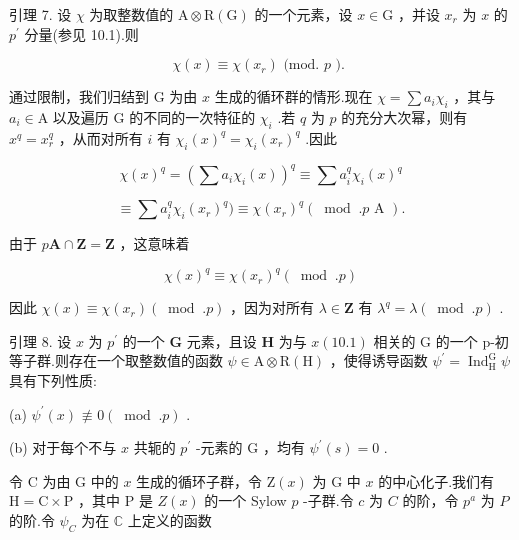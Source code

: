 \documentclass[10pt]{article}
\begin{document}
引理 7. 设 \(\chi\) 为取整数值的 \(\mathrm{A} \otimes  \mathrm{R}\left( \mathrm{G}\right)\) 的一个元素，设 \(x \in  \mathrm{G}\) ，并设 \({x}_{r}\) 为 \(x\) 的 \({p}^{\prime }\) 分量(参见 10.1).则

\[
\chi \left( x\right)  \equiv  \chi \left( {x}_{r}\right) \text{ (mod. }p\text{ ). }
\]

通过限制，我们归结到 G 为由 \(x\) 生成的循环群的情形.现在 \(\chi  = \sum {a}_{i}{\chi }_{i}\) ，其与 \({a}_{i} \in  \mathrm{A}\) 以及遍历 G 的不同的一次特征的 \({\chi }_{i}\) .若 \(q\) 为 \(p\) 的充分大次幂，则有 \({x}^{q} = {x}_{r}^{q}\) ，从而对所有 \(i\) 有 \({\chi }_{i}{\left( x\right) }^{q} = {\chi }_{i}{\left( {x}_{r}\right) }^{q}\) .因此

\[
\chi {\left( x\right) }^{q} = {\left( \sum {a}_{i}{\chi }_{i}\left( x\right) \right) }^{q} \equiv  \sum {a}_{i}^{q}{\chi }_{i}{\left( x\right) }^{q}
\]

\[
\equiv  \sum {a}_{i}^{q}{\chi }_{i}{\left( {x}_{r}\right) }^{q}) \equiv  \chi {\left( {x}_{r}\right) }^{q}\left( {{\;\operatorname{mod}\;.}p\text{ A }}\right) .
\]

由于 \(p\mathbf{A} \cap  \mathbf{Z} = \mathbf{Z}\) ，这意味着

\[
\chi {\left( x\right) }^{q} \equiv  \chi {\left( {x}_{r}\right) }^{q}\left( {\;\operatorname{mod}\;.p}\right)
\]

因此 \(\chi \left( x\right)  \equiv  \chi \left( {x}_{r}\right) \left( {{\;\operatorname{mod}\;.}p}\right)\) ，因为对所有 \(\lambda  \in  \mathbf{Z}\) 有 \({\lambda }^{q} = \lambda \left( {{\;\operatorname{mod}\;.}p}\right)\) .

引理 8. 设 \(x\) 为 \({p}^{\prime }\) 的一个 \(\mathbf{G}\) 元素，且设 \(\mathbf{H}\) 为与 \(x\left( {10.1}\right)\) 相关的 \(\mathrm{G}\) 的一个 p-初等子群.则存在一个取整数值的函数 \(\psi  \in  \mathrm{A} \otimes  \mathrm{R}\left( \mathrm{H}\right)\) ，使得诱导函数 \({\psi }^{\prime } = {\operatorname{Ind}}_{\mathrm{H}}^{\mathrm{G}}\psi\) 具有下列性质:

(a) \({\psi }^{\prime }\left( x\right)  \text{ ≢ } 0\left( {\;\operatorname{mod}\;.p}\right)\) .

(b) 对于每个不与 \(x\) 共轭的 \({p}^{\prime }\) -元素的 \(\mathrm{G}\) ，均有 \({\psi }^{\prime }\left( s\right)  = 0\) .

令 \(\mathrm{C}\) 为由 \(\mathrm{G}\) 中的 \(x\) 生成的循环子群，令 \(\mathrm{Z}\left( x\right)\) 为 \(\mathrm{G}\) 中 \(x\) 的中心化子.我们有 \(\mathrm{H} = \mathrm{C} \times  \mathrm{P}\) ，其中 \(\mathrm{P}\) 是 \(Z\left( x\right)\) 的一个 Sylow \(p\) -子群.令 \(c\) 为 \(C\) 的阶，令 \({p}^{a}\) 为 \(P\) 的阶.令 \({\psi }_{C}\) 为在 \(\mathbb{C}\) 上定义的函数
\end{document}
